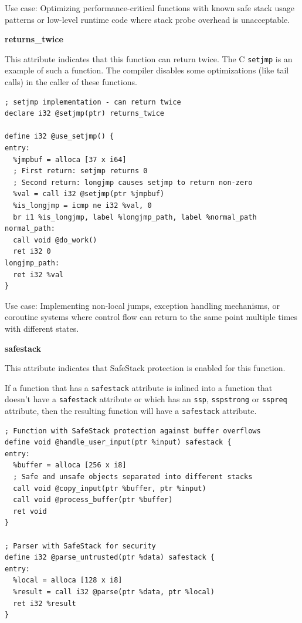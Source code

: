 Use case: Optimizing performance-critical functions with known safe stack usage patterns or low-level runtime code where stack probe overhead is unacceptable.

\textbf{returns\_twice}

This attribute indicates that this function can return twice.
The C \texttt{setjmp} is an example of such a function.
The compiler disables some optimizations (like tail calls) in the caller of these functions.

\begin{lstlisting}[style=ir]
; setjmp implementation - can return twice
declare i32 @setjmp(ptr) returns_twice

define i32 @use_setjmp() {
entry:
  %jmpbuf = alloca [37 x i64]
  ; First return: setjmp returns 0
  ; Second return: longjmp causes setjmp to return non-zero
  %val = call i32 @setjmp(ptr %jmpbuf)
  %is_longjmp = icmp ne i32 %val, 0
  br i1 %is_longjmp, label %longjmp_path, label %normal_path
normal_path:
  call void @do_work()
  ret i32 0
longjmp_path:
  ret i32 %val
}
\end{lstlisting}

Use case: Implementing non-local jumps, exception handling mechanisms, or coroutine systems where control flow can return to the same point multiple times with different states.

\textbf{safestack}

This attribute indicates that SafeStack protection is enabled for this function.

If a function that has a \texttt{safestack} attribute is inlined into a function that doesn't have a \texttt{safestack} attribute or which has an \texttt{ssp}, \texttt{sspstrong} or \texttt{sspreq} attribute, then the resulting function will have a \texttt{safestack} attribute.

\begin{lstlisting}[style=ir]
; Function with SafeStack protection against buffer overflows
define void @handle_user_input(ptr %input) safestack {
entry:
  %buffer = alloca [256 x i8]
  ; Safe and unsafe objects separated into different stacks
  call void @copy_input(ptr %buffer, ptr %input)
  call void @process_buffer(ptr %buffer)
  ret void
}

; Parser with SafeStack for security
define i32 @parse_untrusted(ptr %data) safestack {
entry:
  %local = alloca [128 x i8]
  %result = call i32 @parse(ptr %data, ptr %local)
  ret i32 %result
}
\end{lstlisting}

